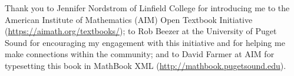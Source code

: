 \documentclass[openany, oneside]{book}
\begin{document}
\bigskip
\noindent
Thank you to Jennifer Nordstrom of Linfield College for introducing me to the American Institute of Mathematics (AIM) Open Textbook Initiative (\url{https://aimath.org/textbooks/}); to Rob Beezer at the University of Puget Sound for encouraging my engagement with this initiative and for helping me make connections within the community; and to David Farmer at AIM for typesetting this book in MathBook XML (\url{http://mathbook.pugetsound.edu}).

\vfill \vfill \vfill


\tableofcontents

\mainmatter












\backmatter
\appendix

\pagestyle{fancy}
\lhead{}
\chead{}
\rhead{\thepage}
\lfoot{}
\cfoot{}
\rfoot{}
\renewcommand{\headrulewidth}{0pt}

\thispagestyle{plain}
{}



\begin{comment}


\chapter{Proof that $S_0$ is trivial}

By definition, $S_0$ is the set of permutations of the empty set, that is, the set of all bijections from $\emptyset$ to $\emptyset$.  If we go back to the true definition of a function, we recall that a function from a set $A$ to itself is a relation $f$ on $A$ (that is, a subset of $A \times A$) such that for each $a\in A$, there is a unique $b\in A$ such that $(a,b)\in f$.

So let A be the empty set.  Then $A \times A$ is also the empty set (do you see why?). Now,  $f=\emptyset$ is a subset of $A \times A$, and it is vacuously true that $f$ has the property that for each $a\in A$, there is a unique $b\in A$ such that $(a,b)\in f$ (it is vacuously true since there are no elements of $A$).  So $f$ is a function from $A$ to $A$. Since there is no other subset of $A \times A$, $f$ is the only function from $A$ to $A$.

The remaining question is: Is  $f$ a permutation on $A$; that is, is $f$ a bijection?  The answer is yes: $f$ is both vacuously onto and vacuously one-to-one.  So there is a unique bijection from $\emptyset$ to $\emptyset$. Formally, it's the subset $\emptyset$ of $\emptyset \times \emptyset$.  Informally, it's the unique map that doesn't send anything anywhere.

Thus, $S_0$ contains exactly one element, and hence is the trivial group.
\end{comment}
\end{document}

